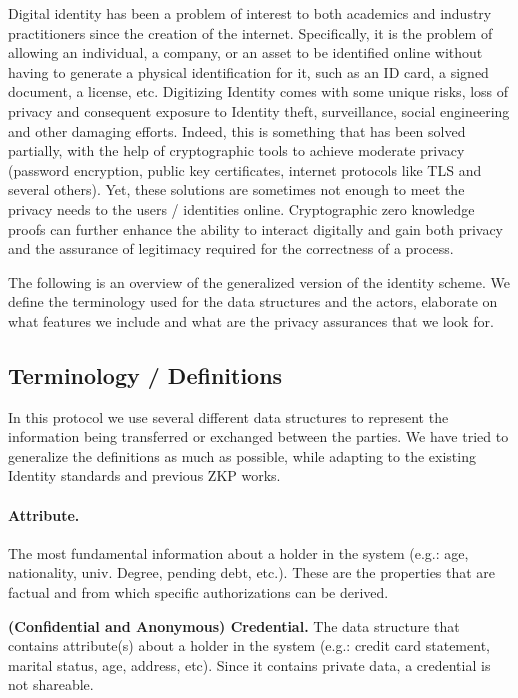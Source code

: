 Digital identity has been a problem of interest to both academics and industry practitioners since the creation of the internet. Specifically, it is the problem of allowing an individual, a company, or an asset to be identified online without having to generate a physical identification for it, such as an ID card, a signed document, a license, etc. Digitizing Identity comes with some unique risks, loss of privacy and consequent exposure to Identity theft, surveillance, social engineering and other damaging efforts. Indeed, this is something that has been solved partially, with the help of cryptographic tools to achieve moderate privacy (password encryption, public key certificates, internet protocols like TLS and several others). Yet, these solutions are sometimes not enough to meet the privacy needs to the users / identities online. Cryptographic zero knowledge proofs can further enhance the ability to interact digitally and gain both privacy and the assurance of legitimacy required for the correctness of a process.
 
The following is an overview of the generalized version of the identity scheme. We define the terminology used for the data structures and the actors, elaborate on what features we include and what are the privacy assurances that we look for. 


\subsection{Terminology / Definitions}
\label{sec:apps:id-framework:terminology}

In this protocol we use several different data structures to represent the information being transferred or exchanged between the parties. We have tried to generalize the definitions as much as possible, while adapting to the existing Identity standards and previous ZKP works.

\paragraph{Attribute.} The most fundamental information about a holder in the system (e.g.: age, nationality, univ. Degree, pending debt, etc.). These are the properties that are factual and from which specific authorizations can be derived.

\textbf{(Confidential and Anonymous) Credential.} The data structure that contains attribute(s) about a holder in the system (e.g.: credit card statement, marital status, age, address, etc). Since it contains private data, a credential is not shareable. 


